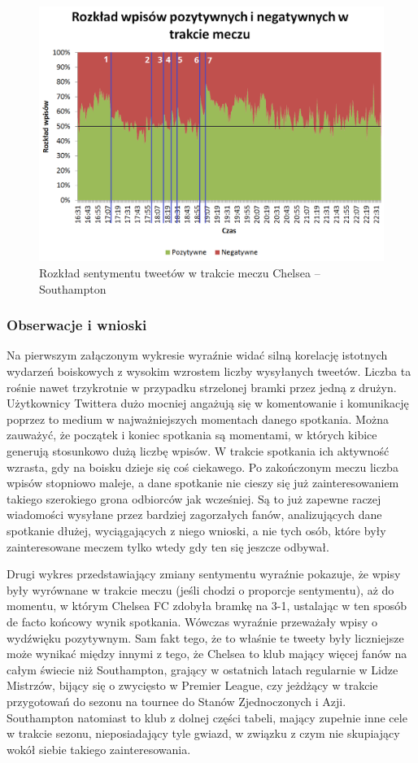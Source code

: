 \begin{figure}[ht!]
\centering
\includegraphics[width=140mm]{img/sentyment-w-meczu-nums-50percentage.png}
\caption{Rozkład sentymentu tweetów w trakcie meczu Chelsea -- Southampton}
\label{image:sentyment-w-meczu}
\end{figure}


\subsubsection{Obserwacje i wnioski}
Na pierwszym załączonym wykresie wyraźnie widać silną korelację istotnych
wydarzeń boiskowych z wysokim wzrostem liczby wysyłanych tweetów. 
Liczba ta rośnie nawet trzykrotnie w przypadku strzelonej bramki przez jedną
z drużyn. Użytkownicy Twittera dużo mocniej angażują się w komentowanie i 
komunikację poprzez to medium w najważniejszych momentach danego spotkania.
Można zauważyć, że początek i koniec spotkania są momentami, w których
kibice generują stosunkowo dużą liczbę wpisów. W trakcie spotkania
ich aktywność wzrasta, gdy na boisku dzieje się coś ciekawego.
Po zakończonym meczu liczba wpisów stopniowo maleje, a dane spotkanie
nie cieszy się już zainteresowaniem takiego szerokiego grona
odbiorców jak wcześniej. Są to już zapewne raczej wiadomości wysyłane
przez bardziej zagorzałych fanów, analizujących dane spotkanie dłużej,
wyciągających z niego wnioski, a nie tych osób, które były zainteresowane
meczem tylko wtedy gdy ten się jeszcze odbywał.

Drugi wykres przedstawiający zmiany sentymentu wyraźnie pokazuje, że wpisy były
wyrównane w trakcie meczu (jeśli chodzi o proporcje sentymentu), aż do momentu,
w którym Chelsea FC zdobyła bramkę na 3-1, ustalając w ten sposób de facto
końcowy wynik spotkania. Wówczas wyraźnie przeważały wpisy o wydźwięku
pozytywnym. Sam fakt tego, że to właśnie te tweety były liczniejsze może wynikać
między innymi z tego, że Chelsea to klub mający więcej fanów na całym świecie
niż Southampton, grający w ostatnich latach regularnie w Lidze Mistrzów, bijący
się o zwycięsto w Premier League, czy jeżdżący w trakcie przygotowań do sezonu
na tournee do Stanów Zjednoczonych i Azji. Southampton natomiast to klub z dolnej
części tabeli, mający zupełnie inne cele w trakcie sezonu, nieposiadający tyle
gwiazd, w związku z czym nie skupiający wokół siebie takiego zainteresowania.

